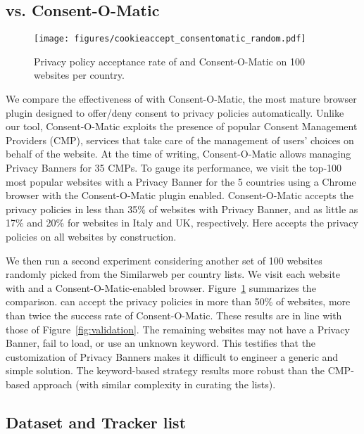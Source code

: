 \subsection{\TOOL vs. Consent-O-Matic}
\label{sec:ca_vs_com}

\begin{figure}[t]
    \centering
    \texttt{[image: figures/cookieaccept\_consentomatic\_random.pdf]}
    \caption{Privacy policy acceptance rate of \TOOL and Consent-O-Matic on 100 websites per country.}
    \label{fig:ca_vs_com}
\end{figure}

We compare the effectiveness of \TOOL with Consent-O-Matic, the most mature browser plugin designed to offer/deny consent to privacy policies automatically. Unlike our tool, Consent-O-Matic exploits the presence of popular Consent Management Providers (CMP), services that take care of the management of users' choices on behalf of the website. At the time of writing, Consent-O-Matic allows managing Privacy Banners for 35 CMPs. To gauge its performance, we visit the top-100 most popular websites with a Privacy Banner for the 5 countries using a Chrome browser with the Consent-O-Matic plugin enabled. Consent-O-Matic accepts the privacy policies in less than 35\% of websites with Privacy Banner, and as little as 17\% and 20\% for websites in Italy and UK, respectively. Here \TOOL accepts the privacy policies on all websites by construction.

We then run a second experiment considering another set of 100 websites randomly picked from the Similarweb per country lists. We visit each website with \TOOL and a Consent-O-Matic-enabled browser. Figure~\ref{fig:ca_vs_com} summarizes the comparison. \TOOL can accept the privacy policies in more than 50\% of websites, more than twice the success rate of Consent-O-Matic. These results are in line with those of Figure~\ref{fig:validation}. The remaining websites may not have a Privacy Banner, fail to load, or use an unknown keyword. This testifies that the customization of Privacy Banners makes it difficult to engineer a generic and simple solution. The keyword-based strategy results more robust than the CMP-based approach (with similar complexity in curating the lists).



\subsection{Dataset and Tracker list}
\label{sec:dataset}

